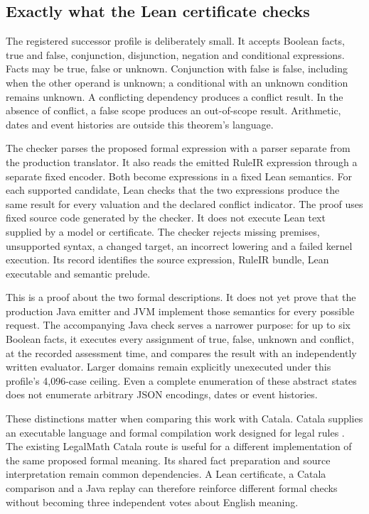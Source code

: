 \documentclass[12pt,a4paper,oneside,openany]{book}
\begin{document}
\subsection{Exactly what the Lean certificate checks}

The registered successor profile is deliberately small. It accepts Boolean
facts, true and false, conjunction, disjunction, negation and conditional
expressions. Facts may be true, false or unknown. Conjunction with false is
false, including when the other operand is unknown; a conditional with an
unknown condition remains unknown. A conflicting dependency produces a conflict
result. In the absence of conflict, a false scope produces an out-of-scope result. Arithmetic, dates and
event histories are outside this theorem's language.

The checker parses the proposed formal expression with a parser separate from
the production translator. It also reads the emitted RuleIR expression through
a separate fixed encoder. Both become expressions in a fixed Lean semantics.
For each supported candidate, Lean checks that the two expressions produce the
same result for every valuation and the declared conflict indicator. The proof
uses fixed source code generated by the checker. It does not execute Lean text
supplied by a model or certificate. The checker rejects missing premises,
unsupported syntax, a changed target, an incorrect lowering and a failed kernel
execution. Its record identifies the source expression, RuleIR bundle, Lean
executable and semantic prelude.

This is a proof about the two formal descriptions. It does not yet prove that
the production Java emitter and JVM implement those semantics for every possible
request. The accompanying Java check serves a narrower purpose: for up to six
Boolean facts, it executes every assignment of true, false, unknown and conflict,
at the recorded assessment time, and compares the result with an independently
written evaluator. Larger domains remain explicitly unexecuted under this
profile's 4,096-case ceiling. Even a complete enumeration of these abstract
states does not enumerate arbitrary JSON encodings, dates or event histories.

These distinctions matter when comparing this work with Catala. Catala supplies
an executable language and formal compilation work designed for legal rules
\citep{catala2021}. The existing LegalMath Catala route is useful for a different
implementation of the same proposed formal meaning. Its shared fact preparation
and source interpretation remain common dependencies. A Lean certificate, a
Catala comparison and a Java replay can therefore reinforce different formal
checks without becoming three independent votes about English meaning.
\end{document}
